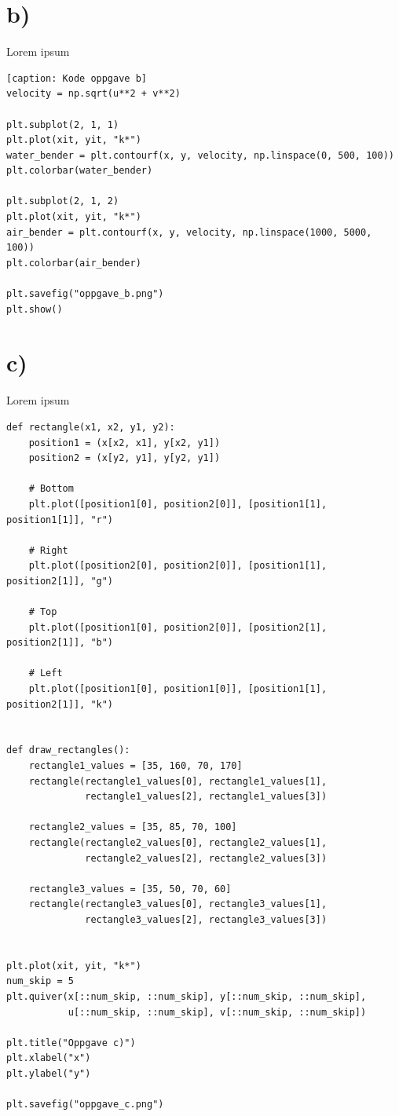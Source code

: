 \documentclass[a4paper,10pt,norsk]{article}
\begin{document}
	\section*{b)}\label{ass:b}
	Lorem ipsum
	\begin{lstlisting}[caption: Kode oppgave b]
velocity = np.sqrt(u**2 + v**2)

plt.subplot(2, 1, 1)
plt.plot(xit, yit, "k*")
water_bender = plt.contourf(x, y, velocity, np.linspace(0, 500, 100))
plt.colorbar(water_bender)

plt.subplot(2, 1, 2)
plt.plot(xit, yit, "k*")
air_bender = plt.contourf(x, y, velocity, np.linspace(1000, 5000, 100))
plt.colorbar(air_bender)

plt.savefig("oppgave_b.png")
plt.show()
	\end{lstlisting}

	\section*{c)}\label{ass:c}
	Lorem ipsum
	\begin{lstlisting}
def rectangle(x1, x2, y1, y2):
    position1 = (x[x2, x1], y[x2, y1])
    position2 = (x[y2, y1], y[y2, y1])

    # Bottom
    plt.plot([position1[0], position2[0]], [position1[1], position1[1]], "r")

    # Right
    plt.plot([position2[0], position2[0]], [position1[1], position2[1]], "g")

    # Top
    plt.plot([position1[0], position2[0]], [position2[1], position2[1]], "b")

    # Left
    plt.plot([position1[0], position1[0]], [position1[1], position2[1]], "k")


def draw_rectangles():
    rectangle1_values = [35, 160, 70, 170]
    rectangle(rectangle1_values[0], rectangle1_values[1],
              rectangle1_values[2], rectangle1_values[3])

    rectangle2_values = [35, 85, 70, 100]
    rectangle(rectangle2_values[0], rectangle2_values[1],
              rectangle2_values[2], rectangle2_values[3])

    rectangle3_values = [35, 50, 70, 60]
    rectangle(rectangle3_values[0], rectangle3_values[1],
              rectangle3_values[2], rectangle3_values[3])


plt.plot(xit, yit, "k*")
num_skip = 5
plt.quiver(x[::num_skip, ::num_skip], y[::num_skip, ::num_skip],
           u[::num_skip, ::num_skip], v[::num_skip, ::num_skip])

plt.title("Oppgave c)")
plt.xlabel("x")
plt.ylabel("y")

plt.savefig("oppgave_c.png")
	\end{lstlisting}
\end{document}

